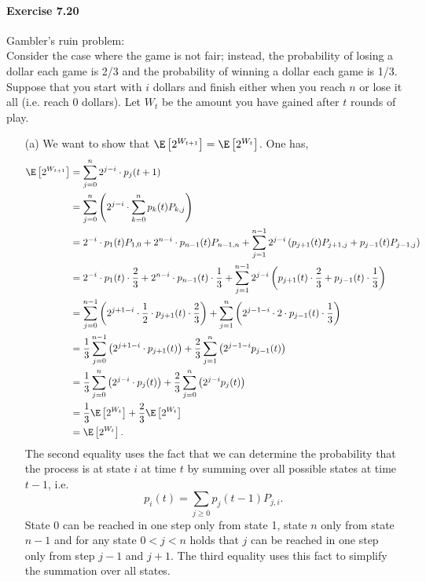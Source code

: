 \paragraph{Exercise 7.20} Gambler’s ruin problem: \\
Consider the case where the game is not fair; instead, the probability of losing
a dollar each game is 2/3 and the probability of winning a dollar each game is
1/3. Suppose that you start with $i$ dollars and finish either when you reach $n$
or lose it all (i.e. reach 0 dollars). Let $W_t$ be the amount you have gained
after $t$ rounds of play.
\begin{enumerate}
  \item[(a)] We want to show that $\E\left[2^{W_{t+1}}\right] = \E\left[2^{W_t}\right]$.
  One has,
  \begin{align*}
    \E\left[ 2^{W_{t+1}}\right]
      &= \sum_{j=0}^{n} 2^{j-i} \cdot p_j(t+1) \\
      &= \sum_{j=0}^n \left( 2^{j-i} \cdot \sum_{k=0}^n p_k(t) P_{k,j} \right) \\
      &= 2^{-i} \cdot p_1(t) P_{1,0} + 2^{n-i} \cdot p_{n-1}(t) P_{n-1,n} + \sum_{j=1}^{n-1} 2^{j-i} \left( p_{j+1}(t) P_{j+1,j} + p_{j-1}(t) P_{j-1,j} \right) \\
      &= 2^{-i} \cdot p_1(t) \cdot \frac{2}{3} + 2^{n-i} \cdot p_{n-1}(t) \cdot \frac{1}{3} + \sum_{j=1}^{n-1} 2^{j-i} \left( p_{j+1}(t) \cdot \frac{2}{3} + p_{j-1}(t) \cdot \frac{1}{3} \right) \\
      &=  \sum_{j=0}^{n-1} \left( 2^{j+1-i} \cdot \frac{1}{2} \cdot p_{j+1}(t) \cdot \frac{2}{3}\right) +
          \sum_{j=1}^{n} \left( 2^{j-1-i} \cdot 2 \cdot p_{j-1}(t) \cdot \frac{1}{3} \right) \\
      &=  \frac{1}{3} \sum_{j=0}^{n-1} \left( 2^{j+1-i} \cdot p_{j+1}(t) \right) +
          \frac{2}{3} \sum_{j=1}^{n} \left( 2^{j-1-i} p_{j-1}(t) \right) \\
      &=  \frac{1}{3} \sum_{j=0}^{n} \left( 2^{j-i} \cdot p_{j}(t) \right) +
          \frac{2}{3} \sum_{j=0}^{n} \left( 2^{j-i} p_{j}(t) \right) \\
      &=  \frac{1}{3} \E\left[2^{W_t}\right] + \frac{2}{3} \E\left[2^{W_t}\right] \\
      &= \E\left[2^{W_t}\right].
  \end{align*}
  The second equality uses the fact that we can determine the probability that the
  process is at state $i$ at time $t$ by summing over all possible states at time
  $t - 1$, i.e.
  \[ p_i(t) = \sum_{j \geq 0} p_j(t-1)P_{j,i}. \]
  State 0 can be reached in one step only from state 1, state $n$ only from state
  $n-1$ and for any state $0 < j < n$ holds that $j$ can be reached in one step
  only from step $j-1$ and $j+1$. The third equality uses this fact to simplify
  the summation over all states.


\end{enumerate}

